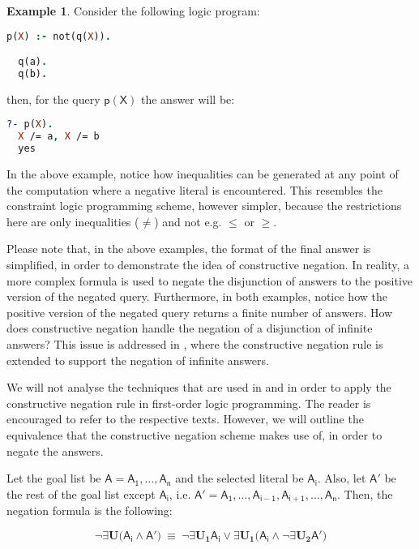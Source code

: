 \documentclass[inscr,ack,preface]{dithesis}
\theoremstyle{definition}
\newtheorem{example}{Example}[chapter]
\newcommand{\msf}[1]{$\mathsf{#1}$}
\begin{document}
\begin{example} Consider the following logic program:
\begin{lstlisting}[language=Prolog,frame=single]
  p(X) :- not(q(X)).

  q(a).
  q(b).
\end{lstlisting}
then, for the query \msf{p(X)} the answer will be:
\begin{lstlisting}[language=Prolog,frame=single]
  ?- p(X).
  X /= a, X /= b
  yes
\end{lstlisting}
\end{example}

In the above example, notice how inequalities can be generated at any point of the computation where a negative literal is encountered. This resembles the constraint logic programming scheme, however simpler, because the restrictions here are only inequalities (\msf{\ne}) and not e.g. \msf{\le} or \msf{\ge}.

Please note that, in the above examples, the format of the final answer is simplified, in order to demonstrate the idea of constructive negation. In reality, a more complex formula is used to negate the disjunction of answers to the positive version of the negated query. Furthermore, in both examples, notice how the positive version of the negated query returns a finite number of answers. How does constructive negation handle the negation of a disjunction of infinite answers? This issue is addressed in \cite{DBLP:conf/slp/Chan89}, where the constructive negation rule is extended to support the negation of infinite answers.

We will not analyse the techniques that are used in \cite{DBLP:conf/iclp/Chan88} and \cite{DBLP:conf/slp/Chan89} in order to apply the constructive negation rule in first-order logic programming. The reader is encouraged to refer to the respective texts. However, we will outline the equivalence that the constructive negation scheme makes use of, in order to negate the answers.

Let the goal list be \msf{A = A_1, \ldots, A_n} and the selected literal be \msf{A_i}. Also, let \msf{A'} be the rest of the goal list except \msf{A_i}, i.e. \msf{A' = A_1, \ldots, A_{i-1}, A_{i+1}, \ldots, A_{n}}. Then, the negation formula is the following:

\begin{equation}\label{eq:cneg}
  \lnot\exists \textbf{U} \big( \mathsf{A_i} \land \mathsf{A'} \big) ~\equiv~
  \lnot\exists \textbf{U}_\textbf{1} \mathsf{A_i} \lor \exists \textbf{U}_\textbf{1} \big( \mathsf{A_i} \land \lnot\exists \textbf{U}_\textbf{2} \mathsf{A'} \big)
\end{equation}
\end{document}
